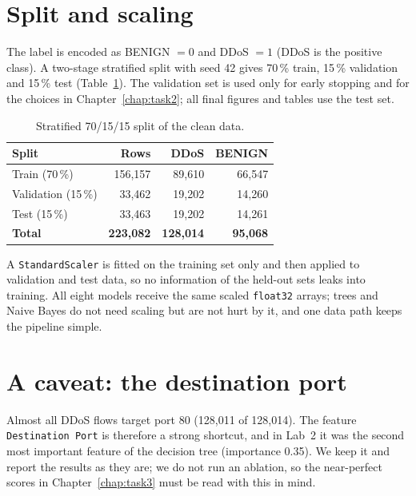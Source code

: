 \section{Split and scaling}
The label is encoded as BENIGN $=0$ and DDoS $=1$ (DDoS is the positive class). A two-stage stratified split with seed 42 gives 70\,\% train, 15\,\% validation and 15\,\% test (Table~\ref{tab:split}). The validation set is used only for early stopping and for the choices in Chapter~\ref{chap:task2}; all final figures and tables use the test set.

\begin{table}[htb]
\centering
\caption{Stratified 70/15/15 split of the clean data.}\label{tab:split}
\begin{tabular}{lrrr}
\toprule
Split & Rows & DDoS & BENIGN \\
\midrule
Train (70\,\%) & 156,157 & 89,610 & 66,547 \\
Validation (15\,\%) & 33,462 & 19,202 & 14,260 \\
Test (15\,\%) & 33,463 & 19,202 & 14,261 \\
\midrule
\textbf{Total} & \textbf{223,082} & \textbf{128,014} & \textbf{95,068} \\
\bottomrule
\end{tabular}
\end{table}

A \texttt{StandardScaler} is fitted on the training set only and then applied to validation and test data, so no information of the held-out sets leaks into training. All eight models receive the same scaled \texttt{float32} arrays; trees and Naive Bayes do not need scaling but are not hurt by it, and one data path keeps the pipeline simple.

\section{A caveat: the destination port}
Almost all DDoS flows target port 80 (128,011 of 128,014). The feature \texttt{Destination Port} is therefore a strong shortcut, and in Lab~2 it was the second most important feature of the decision tree (importance 0.35). We keep it and report the results as they are; we do not run an ablation, so the near-perfect scores in Chapter~\ref{chap:task3} must be read with this in mind.
